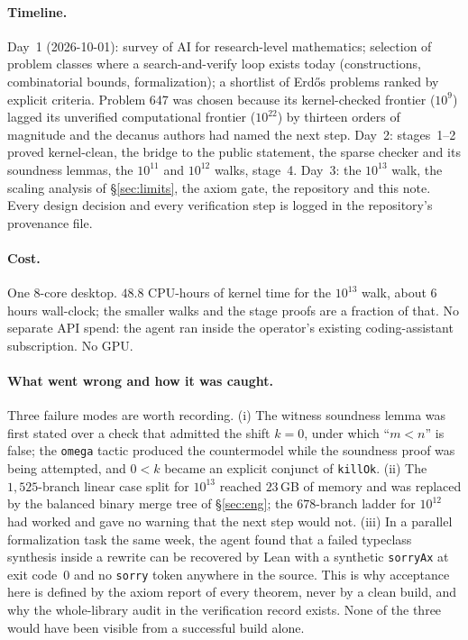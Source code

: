 \documentclass[11pt]{article}
\begin{document}
\paragraph{Timeline.} Day~1 (2026-10-01): survey of AI for research-level mathematics; selection of problem classes where a search-and-verify loop exists today (constructions, combinatorial bounds, formalization); a shortlist of Erd\H{o}s problems ranked by explicit criteria. Problem 647 was chosen because its kernel-checked frontier ($10^{9}$) lagged its unverified computational frontier ($10^{22}$) by thirteen orders of magnitude and the decanus authors had named the next step. Day~2: stages~1--2 proved kernel-clean, the bridge to the public statement, the sparse checker and its soundness lemmas, the $10^{11}$ and $10^{12}$ walks, stage~4. Day~3: the $10^{13}$ walk, the scaling analysis of \S\ref{sec:limits}, the axiom gate, the repository and this note. Every design decision and every verification step is logged in the repository's provenance file.

\paragraph{Cost.} One 8-core desktop. $48.8$ CPU-hours of kernel time for the $10^{13}$ walk, about $6$ hours wall-clock; the smaller walks and the stage proofs are a fraction of that. No separate API spend: the agent ran inside the operator's existing coding-assistant subscription. No GPU.

\paragraph{What went wrong and how it was caught.} Three failure modes are worth recording. (i) The witness soundness lemma was first stated over a check that admitted the shift $k=0$, under which ``$m<n$'' is false; the \texttt{omega} tactic produced the countermodel while the soundness proof was being attempted, and $0<k$ became an explicit conjunct of \texttt{killOk}. (ii) The $1{,}525$-branch linear case split for $10^{13}$ reached $23$\,GB of memory and was replaced by the balanced binary merge tree of \S\ref{sec:eng}; the $678$-branch ladder for $10^{12}$ had worked and gave no warning that the next step would not. (iii) In a parallel formalization task the same week, the agent found that a failed typeclass synthesis inside a rewrite can be recovered by Lean with a synthetic \texttt{sorryAx} at exit code~0 and no \texttt{sorry} token anywhere in the source. This is why acceptance here is defined by the axiom report of every theorem, never by a clean build, and why the whole-library audit in the verification record exists. None of the three would have been visible from a successful build alone.
\end{document}
